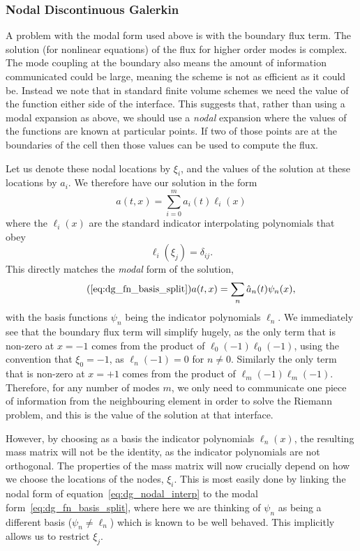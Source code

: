 \subsubsection{Nodal Discontinuous Galerkin}
\label{sec:dg_nodal}

A problem with the modal form used above is with the boundary flux term.
The solution (for nonlinear equations) of the flux for higher order modes is
complex. The mode coupling at the boundary also means the amount of information
communicated could be large, meaning the scheme is not as efficient as it could
be. Instead we note that in standard finite volume schemes we need the value of
the function either side of the interface. This suggests that, rather than using
a modal expansion as above, we should use a \emph{nodal} expansion where the
values of the functions are known at particular points. If two of those points
are at the boundaries of the cell then those values can be used to compute the
flux.

Let us denote these nodal locations by $\xi_i$, and the values of the solution
at these locations by $a_i$. We therefore have our solution in the form
%
\begin{equation}
  \label{eq:dg_nodal_interp}
  a(t, x) = \sum_{i=0}^m a_i(t) \ell_i(x)
\end{equation}
%
where the $\ell_i(x)$ are the standard indicator interpolating polynomials that
obey
%
\begin{equation}
  \label{eq:dg_nodal_interp_indicator}
  \ell_i(\xi_j) = \delta_{ij}.
\end{equation}
%
This directly matches the \emph{modal} form of the solution,
%
\begin{equation}
  \tag{\ref{eq:dg_fn_basis_split}}
  a(t, x) = \sum_n \hat{a}_n(t) \psi_n(x),
\end{equation}
%
with the basis functions $\psi_n$ being the indicator polynomials $\ell_n$. We
immediately see that the boundary flux term will simplify hugely, as the only
term that is non-zero at $x=-1$ comes from the product of $\ell_0(-1) \ell_0(-1)$,
using the convention that $\xi_0 = -1$, as $\ell_n(-1) = 0$ for $n \ne 0$.
Similarly the only term that is non-zero at $x=+1$ comes from the product of
$\ell_m(-1) \ell_m(-1)$. Therefore, for any number of modes $m$, we only need to
communicate one piece of information from the neighbouring element in order to
solve the Riemann problem, and this is the value of the solution at that interface.

However, by choosing as a basis the indicator polynomials $\ell_n(x)$, the
resulting mass matrix will not be the identity, as the indicator polynomials are
not orthogonal. The properties of the mass matrix will now crucially depend on
how we choose the locations of the nodes, $\xi_i$. This is most easily done by
linking the nodal form of equation~\eqref{eq:dg_nodal_interp} to the modal
form~\eqref{eq:dg_fn_basis_split}, where here we are thinking of $\psi_n$ as
being a different basis ($\psi_n \ne \ell_n$) which is known to be well behaved.
This implicitly allows us to restrict $\xi_j$.

